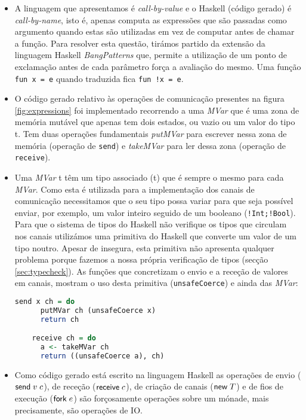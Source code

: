 \begin{itemize}
\item  A linguagem que apresentamos é \textit{call-by-value} e o Haskell (código gerado) é \textit{call-by-name}, isto é, apenas computa as expressões que são passadas como argumento quando estas são utilizadas em vez de computar antes de chamar a função. Para resolver esta questão, tirámos partido da extensão da linguagem Haskell \textit{BangPatterns} que, permite a utilização de um ponto de exclamação antes de cada parâmetro força a avaliação do mesmo. Uma função \lstinline"fun x = e" quando traduzida fica \lstinline"fun !x = e".
\newline
\item O código gerado relativo às operações de comunicação presentes na figura \ref{fig:expressions} foi implementado recorrendo a uma \textit{MVar} que é uma zona de memória mutável que apenas tem dois estados, ou vazio ou um valor do tipo t. Tem duas operações fundamentais \textit{putMVar} para escrever nessa zona de memória (operação de \lstinline"send") e \textit{takeMVar} para ler dessa zona (operação de \lstinline"receive").
\newline
\item Uma \textit{MVar} t têm um tipo associado (t) que é sempre o mesmo para cada \textit{MVar}. Como esta é utilizada para a implementação dos canais de comunicação necessitamos que o seu tipo possa variar para que seja possível enviar, por exemplo, um valor inteiro seguido de um booleano (\lstinline"!Int;!Bool"). Para que o sistema de tipos do Haskell não verifique os tipos que circulam nos canais utilizámos uma primitiva do Haskell que converte um valor de um tipo noutro. Apesar de insegura, esta primitiva não apresenta qualquer problema porque fazemos a nossa própria verificação de tipos (secção \ref{sec:typecheck}).
  As funções que concretizam o envio e a receção de valores em canais, mostram o uso desta primitiva (\lstinline|unsafeCoerce|) e ainda das \textit{MVar}:
  \begin{lstlisting}[language=Haskell]
    send x ch = do
      putMVar ch (unsafeCoerce x)
      return ch

    receive ch = do
      a <- takeMVar ch
      return ((unsafeCoerce a), ch)
  \end{lstlisting}

\item Como código gerado está escrito na linguagem Haskell as operações de envio ($\mathsf{send}\;v\; c$), de receção ($\mathsf{receive}\;c$), de criação de canais ($\mathsf{new}\;T$) e de fios de execução ($\mathsf{fork}\;e$) são forçosamente operações sobre um mónade, mais precisamente, são operações de IO.


\end{itemize}
